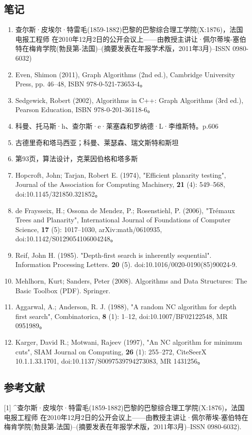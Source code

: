 \subsection{笔记}
\begin{enumerate}
\item 查尔斯·皮埃尔·特雷毛(1859-1882)巴黎的巴黎综合理工学院(X:1876)，法国电报工程师
在2010年12月2日的公开会议上——由教授主讲让·佩尔蒂埃-塞伯特在梅肯学院(勃艮第-法国)–(摘要发表在年报学术版，2011年3月)–ISSN 0980-6032)
\item Even, Shimon (2011), Graph Algorithms (2nd ed.), Cambridge University Press, pp. 46–48, ISBN 978-0-521-73653-4。
\item Sedgewick, Robert (2002), Algorithms in C++: Graph Algorithms (3rd ed.), Pearson Education, ISBN 978-0-201-36118-6。
\item 科曼、托马斯·h、查尔斯·e·莱塞森和罗纳德·L·李维斯特。p.606
\item 古德里奇和塔马西亚；科曼、莱瑟森、瑞文斯特和斯坦
\item 第93页，算法设计，克莱因伯格和塔多斯
\item Hopcroft, John; Tarjan, Robert E. (1974), "Efficient planarity testing", Journal of the Association for Computing Machinery, \textbf{21} (4): 549–568, doi:10.1145/321850.321852。
\item de Fraysseix, H.; Ossona de Mendez, P.; Rosenstiehl, P. (2006), "Trémaux Trees and Planarity", International Journal of Foundations of Computer Science, \textbf{17} (5): 1017–1030, arXiv:math/0610935, doi:10.1142/S0129054106004248。
\item Reif, John H. (1985). "Depth-first search is inherently sequential". Information Processing Letters. \textbf{20} (5). doi:10.1016/0020-0190(85)90024-9.
\item Mehlhorn, Kurt; Sanders, Peter (2008). Algorithms and Data Structures: The Basic Toolbox (PDF). Springer.
\item Aggarwal, A.; Anderson, R. J. (1988), "A random NC algorithm for depth first search", Combinatorica, \textbf{8} (1): 1–12, doi:10.1007/BF02122548, MR 0951989。
\item Karger, David R.; Motwani, Rajeev (1997), "An NC algorithm for minimum cuts", SIAM Journal on Computing, \textbf{26} (1): 255–272, CiteSeerX 10.1.1.33.1701, doi:10.1137/S0097539794273083, MR 1431256。
\end{enumerate}

\subsection{参考文献}
[1]
^查尔斯·皮埃尔·特雷毛(1859-1882)巴黎的巴黎综合理工学院(X:1876)，法国电报工程师 在2010年12月2日的公开会议上——由教授主讲让·佩尔蒂埃-塞伯特在梅肯学院(勃艮第-法国)–(摘要发表在年报学术版，2011年3月)–ISSN 0980-6032).

